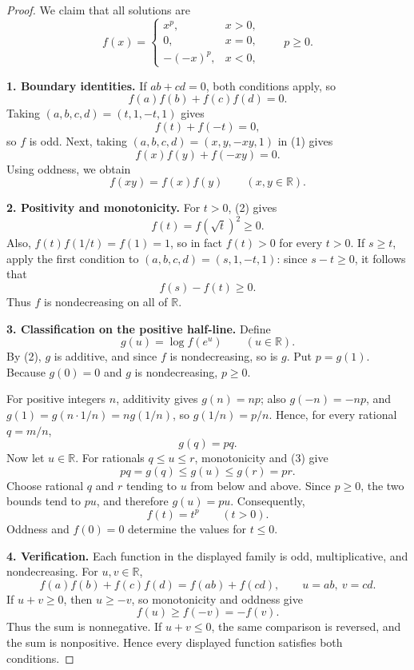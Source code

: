 
\begin{dlsummary}[title={\bfseries Solution 68. The Conditioned Bilinear Sign Test},breakable]

\begin{proof}
We claim that all solutions are
\[
\boxed{
f(x)=
\begin{cases}
x^p,&x>0,\\
0,&x=0,\\
-(-x)^p,&x<0,
\end{cases}
\qquad p\geq0.}
\]

\medskip
\noindent\textbf{1. Boundary identities.}
If $ab+cd=0$, both conditions apply, so
\[
f(a)f(b)+f(c)f(d)=0. \tag{1}
\]
Taking $(a,b,c,d)=(t,1,-t,1)$ gives
\[
f(t)+f(-t)=0,
\]
so $f$ is odd. Next, taking $(a,b,c,d)=(x,y,-xy,1)$ in (1) gives
\[
f(x)f(y)+f(-xy)=0.
\]
Using oddness, we obtain
\[
f(xy)=f(x)f(y)\qquad(x,y\in\mathbb R). \tag{2}
\]

\medskip
\noindent\textbf{2. Positivity and monotonicity.}
For $t>0$, (2) gives
\[
f(t)=f(\sqrt t)^2\geq0.
\]
Also, $f(t)f(1/t)=f(1)=1$, so in fact $f(t)>0$ for every $t>0$.
If $s\geq t$, apply the first condition to $(a,b,c,d)=(s,1,-t,1)$:
since $s-t\geq0$, it follows that
\[
f(s)-f(t)\geq0.
\]
Thus $f$ is nondecreasing on all of $\mathbb R$.

\medskip
\noindent\textbf{3. Classification on the positive half-line.}
Define
\[
g(u)=\log f(e^u)\qquad(u\in\mathbb R).
\]
By (2), $g$ is additive, and since $f$ is nondecreasing, so is $g$.
Put $p=g(1)$. Because $g(0)=0$ and $g$ is nondecreasing, $p\geq0$.

For positive integers $n$, additivity gives $g(n)=np$; also
$g(-n)=-np$, and $g(1)=g(n\cdot 1/n)=n g(1/n)$, so
$g(1/n)=p/n$. Hence, for every rational $q=m/n$,
\[
g(q)=pq. \tag{3}
\]
Now let $u\in\mathbb R$. For rationals $q\leq u\leq r$, monotonicity and (3) give
\[
pq=g(q)\leq g(u)\leq g(r)=pr.
\]
Choose rational $q$ and $r$ tending to $u$ from below and above. Since $p\geq0$,
the two bounds tend to $pu$, and therefore $g(u)=pu$. Consequently,
\[
f(t)=t^p\qquad(t>0). \tag{4}
\]
Oddness and $f(0)=0$ determine the values for $t\leq0$.

\medskip
\noindent\textbf{4. Verification.}
Each function in the displayed family is odd, multiplicative, and nondecreasing.
For $u,v\in\mathbb R$,
\[
f(a)f(b)+f(c)f(d)=f(ab)+f(cd),
\qquad u=ab,\ v=cd.
\]
If $u+v\geq0$, then $u\geq-v$, so monotonicity and oddness give
\[
f(u)\geq f(-v)=-f(v).
\]
Thus the sum is nonnegative. If $u+v\leq0$, the same comparison is reversed,
and the sum is nonpositive. Hence every displayed function satisfies both conditions.
\end{proof}
\end{dlsummary}

